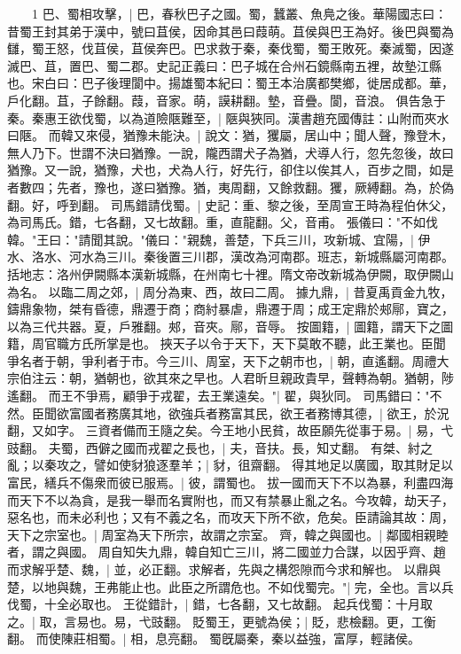 　　1 巴、蜀相攻擊，|{
	巴，春秋巴子之國。蜀，蠶叢、魚鳧之後。華陽國志曰：昔蜀王封其弟于漢中，號曰苴侯，因命其邑曰葭萌。苴侯與巴王為好。後巴與蜀為讎，蜀王怒，伐苴侯，苴侯奔巴。巴求救于秦，秦伐蜀，蜀王敗死。秦滅蜀，因遂滅巴、苴，置巴、蜀二郡。史記正義曰：巴子城在合州石鏡縣南五裡，故墊江縣也。宋白曰：巴子後理閬中。揚雄蜀本紀曰：蜀王本治廣都樊鄉，徙居成都。華，戶化翻。苴，子餘翻。葭，音家。萌，謨耕翻。墊，音疊。閬，音浪。
	}
俱告急于秦。秦惠王欲伐蜀，以為道險陿難至，|{
	陿與狹同。漢書趙充國傳註：山附而夾水曰陿。
	}
而韓又來侵，猶豫未能決。|{
	說文：猶，玃屬，居山中；聞人聲，豫登木，無人乃下。世謂不決曰猶豫。一說，隴西謂犬子為猶，犬導人行，忽先忽後，故曰猶豫。又一說，猶豫，犬也，犬為人行，好先行，卻住以俟其人，百步之間，如是者數四；先者，豫也，遂曰猶豫。猶，夷周翻，又餘救翻。玃，厥縛翻。為，於偽翻。好，呼到翻。
	}
司馬錯請伐蜀。|{
	史記：重、黎之後，至周宣王時為程伯休父，為司馬氏。錯，七各翻，又七故翻。重，直龍翻。父，音甫。
	}
張儀曰："不如伐韓。"王曰："請聞其說。"儀曰："親魏，善楚，下兵三川，攻新城、宜陽，|{
	伊水、洛水、河水為三川。秦後置三川郡，漢改為河南郡。班志，新城縣屬河南郡。括地志：洛州伊闕縣本漢新城縣，在州南七十裡。隋文帝改新城為伊闕，取伊闕山為名。
	}
以臨二周之郊，|{
	周分為東、西，故曰二周。
	}
據九鼎，|{
	昔夏禹貢金九牧，鑄鼎象物，桀有昏德，鼎遷于商；商紂暴虐，鼎遷于周；成王定鼎於郟鄏，寶之，以為三代共器。夏，戶雅翻。郟，音夾。鄏，音辱。
	}
按圖籍，|{
	圖籍，謂天下之圖籍，周官職方氏所掌是也。
	}
挾天子以令于天下，天下莫敢不聽，此王業也。臣聞爭名者于朝，爭利者于市。今三川、周室，天下之朝市也，|{
	朝，直遙翻。周禮大宗伯注云：朝，猶朝也，欲其來之早也。人君昕旦親政貴早，聲轉為朝。猶朝，陟遙翻。
	}
而王不爭焉，顧爭于戎翟，去王業遠矣。"|{
	翟，與狄同。
	}
司馬錯曰："不然。臣聞欲富國者務廣其地，欲強兵者務富其民，欲王者務博其德，|{
	欲王，於況翻，又如字。
	}
三資者備而王隨之矣。今王地小民貧，故臣願先從事于易。|{
	易，弋豉翻。
	}
夫蜀，西僻之國而戎翟之長也，|{
	夫，音扶。長，知丈翻。
	}
有桀、紂之亂；以秦攻之，譬如使豺狼逐羣羊；|{
	豺，徂齋翻。
	}
得其地足以廣國，取其財足以富民，繕兵不傷衆而彼已服焉。|{
	彼，謂蜀也。
	}
拔一國而天下不以為暴，利盡四海而天下不以為貪，是我一舉而名實附也，而又有禁暴止亂之名。今攻韓，劫天子，惡名也，而未必利也；又有不義之名，而攻天下所不欲，危矣。臣請論其故：周，天下之宗室也。|{
	周室為天下所宗，故謂之宗室。
	}
齊，韓之與國也。|{
	鄰國相親睦者，謂之與國。
	}
周自知失九鼎，韓自知亡三川，將二國並力合謀，以因乎齊、趙而求解乎楚、魏，|{
	並，必正翻。求解者，先與之構怨隙而今求和解也。
	}
以鼎與楚，以地與魏，王弗能止也。此臣之所謂危也。不如伐蜀完。"|{
	完，全也。言以兵伐蜀，十全必取也。
	}
王從錯計，|{
	錯，七各翻，又七故翻。
	}
起兵伐蜀：十月取之。|{
	取，言易也。易，弋豉翻。
	}
貶蜀王，更號為侯；|{
	貶，悲檢翻。更，工衡翻。
	}
而使陳莊相蜀。|{
	相，息亮翻。
	}
蜀旣屬秦，秦以益強，富厚，輕諸侯。

